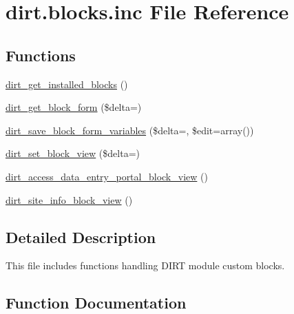\hypertarget{dirt_8blocks_8inc}{}\section{dirt.\+blocks.\+inc File Reference}
\label{dirt_8blocks_8inc}
\subsection*{Functions}
\begin{DoxyCompactItemize}
\item 
\mbox{\hyperlink{dirt_8blocks_8inc_a2c698c2cb98473d22312359f503a7934}{dirt\+\_\+get\+\_\+installed\+\_\+blocks}} ()
\item 
\mbox{\hyperlink{dirt_8blocks_8inc_ad8b36bd9c0cfe696e9cba1019bf0c215}{dirt\+\_\+get\+\_\+block\+\_\+form}} (\$delta=\textquotesingle{}\textquotesingle{})
\item 
\mbox{\hyperlink{dirt_8blocks_8inc_aba5d3fa767c36f28f2265df12772b4b0}{dirt\+\_\+save\+\_\+block\+\_\+form\+\_\+variables}} (\$delta=\textquotesingle{}\textquotesingle{}, \$edit=array())
\item 
\mbox{\hyperlink{dirt_8blocks_8inc_a8ee0b78826230b68c55faae5bfbf15c9}{dirt\+\_\+set\+\_\+block\+\_\+view}} (\$delta=\textquotesingle{}\textquotesingle{})
\item 
\mbox{\hyperlink{dirt_8blocks_8inc_af357546d1fa9a911d3d691f9209593df}{dirt\+\_\+access\+\_\+data\+\_\+entry\+\_\+portal\+\_\+block\+\_\+view}} ()
\item 
\mbox{\hyperlink{dirt_8blocks_8inc_aac441ea675cae18dfad56cfab9911016}{dirt\+\_\+site\+\_\+info\+\_\+block\+\_\+view}} ()
\end{DoxyCompactItemize}


\subsection{Detailed Description}
This file includes functions handling D\+I\+RT module custom blocks. 

\subsection{Function Documentation}
\mbox{\label{dirt_8blocks_8inc_af357546d1fa9a911d3d691f9209593df}} 
